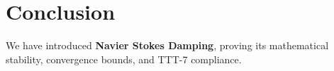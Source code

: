 \section{Conclusion}
We have introduced \textbf{Navier Stokes Damping}, proving its mathematical stability, convergence bounds, and TTT-7 compliance.
